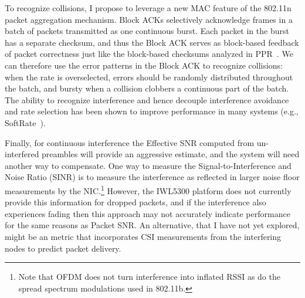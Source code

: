 To recognize collisions, I propose to leverage a new MAC feature of the 802.11n packet aggregation mechanism. Block ACKs selectively acknowledge frames in a batch of packets transmitted as one continuous burst. Each packet in the burst has a separate checksum, and thus the Block ACK serves as block-based feedback of packet correctness just like the block-based checksums analyzed in PPR~\cite{Jamieson_PPR}. We can therefore use the error patterns in the Block ACK to recognize collisions: when the rate is overselected, errors should be randomly distributed throughout the batch, and bursty when a collision clobbers a continuous part of the batch. The ability to recognize interference and hence decouple interference avoidance and rate selection has been shown to improve performance in many systems (e.g., SoftRate~\cite{Vutukuru_SoftRate}).

Finally, for continuous interference the Effective SNR computed from un-interfered preambles will provide an aggressive estimate, and the system will need another way to compensate. One way to measure the Signal-to-Interference and Noise Ratio (SINR) is to measure the interference as reflected in larger noise floor measurements by the NIC.\footnote{Note that OFDM does not turn interference into inflated RSSI as do the spread spectrum modulations used in 802.11b.} However, the IWL5300 platform does not currently provide this information for dropped packets, and if the interference also experiences fading then this approach may not accurately indicate performance for the same reasons as Packet SNR. An alternative, that I have not yet explored, might be an  metric that incorporates CSI measurements from the interfering nodes to predict packet delivery.


